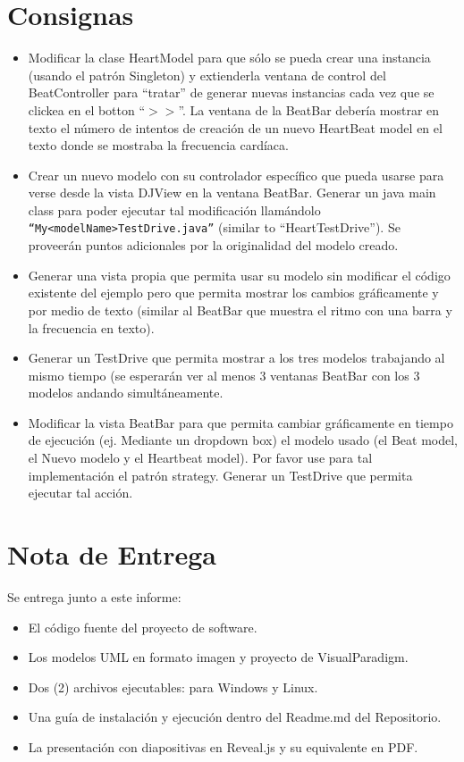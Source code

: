 \documentclass[10pt]{article} %
\begin{document}
\section{Consignas}
\begin{itemize}
\item Modificar la clase HeartModel para que sólo se pueda crear una instancia (usando el patrón 
Singleton) y extienderla ventana de control del BeatController para “tratar” de generar nuevas 
instancias cada vez que se clickea en el  botton “$>>$”. La ventana de  la BeatBar debería mostrar 
en texto el número de intentos de creación de un nuevo HeartBeat model en el texto donde se 
mostraba la frecuencia cardíaca.

\item Crear un nuevo modelo con su controlador específico que pueda usarse para verse desde la 
vista DJView en la ventana BeatBar. Generar un java main class para poder ejecutar tal 
modificación llamándolo \verb+“My<modelName>TestDrive.java”+ (similar to “HeartTestDrive”). Se 
proveerán puntos adicionales por la originalidad del modelo creado.

\item Generar una vista propia que permita usar su modelo sin modificar el código existente del 
ejemplo pero que permita mostrar los cambios gráficamente y por medio de texto (similar al 
BeatBar que muestra el ritmo con una barra y la frecuencia en texto).  

\item Generar un TestDrive que permita mostrar a los tres modelos trabajando al mismo tiempo (se 
esperarán ver al menos 3 ventanas BeatBar con los 3 modelos andando simultáneamente.

\item Modificar la vista BeatBar para que permita cambiar gráficamente en tiempo de ejecución (ej. 
Mediante un dropdown box) el modelo usado (el Beat model, el Nuevo modelo y el Heartbeat 
model). Por favor use para tal implementación el patrón strategy. Generar un TestDrive que 
permita ejecutar tal acción. 

\end{itemize}


\section{Nota de Entrega}
Se entrega junto a este informe:
\begin{itemize}
\item El código fuente del proyecto de software.
\item Los modelos UML en formato imagen y proyecto de VisualParadigm\circledR.
\item Dos (2) archivos ejecutables: para Windows y Linux.
\item Una guía de instalación y ejecución dentro del Readme.md del Repositorio.
\item La presentación con diapositivas en Reveal.js y su equivalente en PDF.
\end{itemize}
\end{document}
